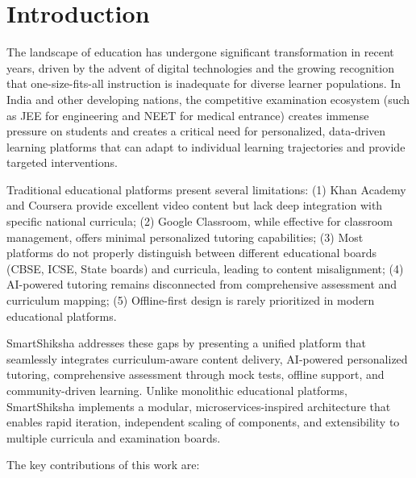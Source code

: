 \documentclass[10pt,conference,compsocconf]{IEEEtran}
\begin{document}
\IEEEpeerreviewmaketitle

\section{Introduction}
\label{sec:introduction}

The landscape of education has undergone significant transformation in recent years, driven by the advent of digital technologies and the growing recognition that one-size-fits-all instruction is inadequate for diverse learner populations. In India and other developing nations, the competitive examination ecosystem (such as JEE for engineering and NEET for medical entrance) creates immense pressure on students and creates a critical need for personalized, data-driven learning platforms that can adapt to individual learning trajectories and provide targeted interventions.

Traditional educational platforms present several limitations: (1) Khan Academy and Coursera provide excellent video content but lack deep integration with specific national curricula; (2) Google Classroom, while effective for classroom management, offers minimal personalized tutoring capabilities; (3) Most platforms do not properly distinguish between different educational boards (CBSE, ICSE, State boards) and curricula, leading to content misalignment; (4) AI-powered tutoring remains disconnected from comprehensive assessment and curriculum mapping; (5) Offline-first design is rarely prioritized in modern educational platforms.

SmartShiksha addresses these gaps by presenting a unified platform that seamlessly integrates curriculum-aware content delivery, AI-powered personalized tutoring, comprehensive assessment through mock tests, offline support, and community-driven learning. Unlike monolithic educational platforms, SmartShiksha implements a modular, microservices-inspired architecture that enables rapid iteration, independent scaling of components, and extensibility to multiple curricula and examination boards.

The key contributions of this work are:
\end{document}
